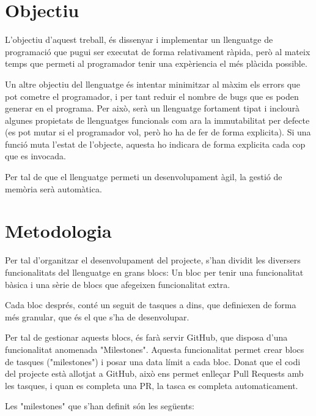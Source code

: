 \documentclass{article}
\begin{document}
\section{Objectiu}
L'objectiu d'aquest treball, és dissenyar i implementar un llenguatge de 
programació que pugui ser executat de forma relativament ràpida, però al mateix 
temps que permeti al programador tenir una expèriencia el més plàcida possible.

Un altre objectiu del llenguatge és intentar minimitzar al màxim els errors que
pot cometre el programador, i per tant reduir el nombre de bugs que es poden
generar en el programa. Per això, serà un llenguatge fortament tipat i inclourà
algunes propietats de llenguatges funcionals com ara la immutabilitat per 
defecte (es pot mutar si el programador vol, però ho ha de fer de forma 
explicita). Si una funció muta l'estat de l'objecte, aquesta ho indicara de 
forma explicita cada cop que es invocada.

Per tal de que el llenguatge permeti un desenvolupament àgil, la gestió de 
memòria serà automàtica.



\section{Metodologia}
Per tal d'organitzar el desenvolupament del projecte, s'han dividit les 
diversers funcionalitats del llenguatge en grans blocs: Un bloc per tenir una 
funcionalitat bàsica i una sèrie de blocs que afegeixen funcionalitat extra.

Cada bloc després, conté un seguit de tasques a dins, que definiexen de forma
més granular, que és el que s'ha de desenvolupar.

Per tal de gestionar aquests blocs, és farà servir GitHub, que disposa d'una 
funcionalitat anomenada "Milestones". Aquesta funcionalitat permet crear blocs
de tasques ("milestones")  i posar una data límit a cada bloc. Donat que el 
codi del projecte està allotjat a GitHub, això ens permet enlleçar Pull Requests
amb les tasques, i quan es completa una PR, la tasca es completa automaticament.

Les "milestones" que s'han definit són les següents:
\end{document}
